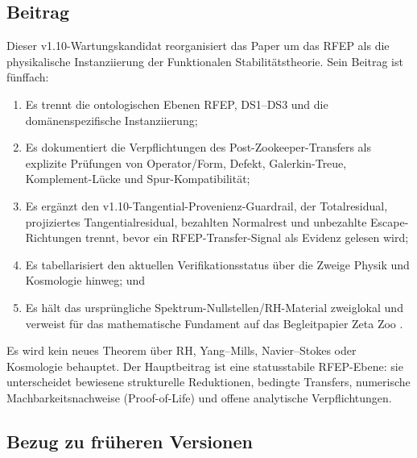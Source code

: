 \documentclass[11pt,a4paper]{article}
\theoremstyle{plain}
\theoremstyle{definition}
\begin{document}
\subsection{Beitrag}

Dieser v1.10-Wartungskandidat reorganisiert das Paper um das RFEP als die physikalische
Instanziierung der Funktionalen Stabilitätstheorie. Sein Beitrag ist fünffach:
\begin{enumerate}[leftmargin=*]
  \item Es trennt die ontologischen Ebenen RFEP, DS1--DS3 und die domänenspezifische Instanziierung;
  \item Es dokumentiert die Verpflichtungen des Post-Zookeeper-Transfers als explizite Prüfungen
    von Operator/Form, Defekt, Galerkin-Treue, Komplement-Lücke und Spur-Kompatibilität;
  \item Es ergänzt den v1.10-Tangential-Provenienz-Guardrail, der
    Totalresidual, projiziertes Tangentialresidual, bezahlten
    Normalrest und unbezahlte Escape-Richtungen trennt, bevor ein
    RFEP-Transfer-Signal als Evidenz gelesen wird;
  \item Es tabellarisiert den aktuellen Verifikationsstatus über die Zweige Physik und Kosmologie hinweg; und
  \item Es hält das ursprüngliche Spektrum-Nullstellen/RH-Material zweiglokal und
    verweist für das mathematische Fundament auf das Begleitpapier Zeta Zoo \cite{ZetaZooMaster}.
\end{enumerate}

Es wird kein neues Theorem über RH, Yang--Mills, Navier--Stokes oder Kosmologie behauptet.
Der Hauptbeitrag ist eine statusstabile RFEP-Ebene: sie unterscheidet bewiesene
strukturelle Reduktionen, bedingte Transfers, numerische Machbarkeitsnachweise
(Proof-of-Life) und offene analytische Verpflichtungen.

\subsection{Bezug zu früheren Versionen}
\end{document}
